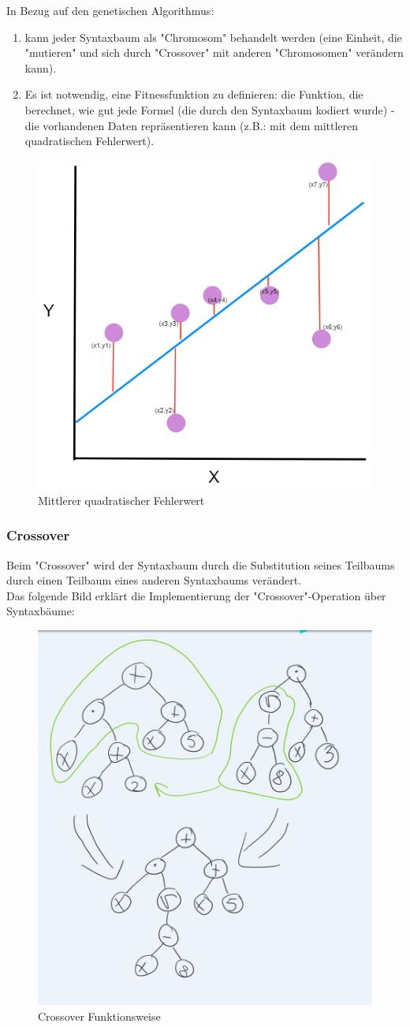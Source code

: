 \documentclass[ngerman]{article}
\begin{document}
In Bezug auf den genetischen Algorithmus:
\begin{enumerate}
	\item  kann jeder Syntaxbaum als "Chromosom" behandelt werden (eine Einheit, die "mutieren" und sich durch "Crossover" mit anderen "Chromosomen" verändern kann).
	\item Es ist notwendig, eine Fitnessfunktion zu definieren: die Funktion, die berechnet, wie gut jede Formel (die durch den Syntaxbaum kodiert wurde) - die vorhandenen Daten repräsentieren kann (z.B.: mit dem mittleren quadratischen Fehlerwert).
\end{enumerate}


\begin{figure}[h]
	\centering
	\includegraphics[width=0.4\linewidth]{mse.png}
	\caption{Mittlerer quadratischer Fehlerwert}
	\label{fig::mse}
\end{figure}
\newpage
\subsubsection{Crossover}
Beim "Crossover" wird der Syntaxbaum durch die Substitution seines Teilbaums durch einen Teilbaum eines anderen Syntaxbaums verändert.
\\
Das folgende Bild erklärt die Implementierung der "Crossover"-Operation über Syntaxbäume:


\begin{figure}[h]
	\centering
	\includegraphics[width=0.25\linewidth]{crossover.jpg}
	\caption{Crossover Funktionsweise}
	\label{fig::cross}
\end{figure}
\end{document}
